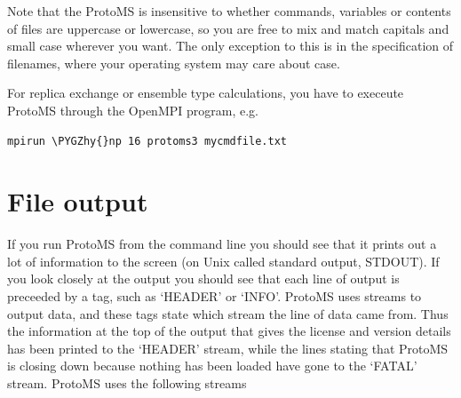 \documentclass[letterpaper,10pt,english]{sphinxmanual}
\def\PYGZhy{\char`\-}
\begin{document}
Note that the ProtoMS is insensitive to whether commands, variables or contents of files are uppercase or lowercase, so you are free to mix and match capitals and small case wherever you want. The only exception to this is in the specification of filenames, where your operating system may care about case.

For replica exchange or ensemble type calculations, you have to execeute ProtoMS through the OpenMPI program, e.g.

\begin{Verbatim}[frame=single,commandchars=\\\{\}]
mpirun \PYGZhy{}np 16 protoms3 mycmdfile.txt
\end{Verbatim}


\section{File output}
\label{protoms:file-output}\label{protoms:index-27}
If you run ProtoMS from the command line you should see that it prints out a lot of information to the screen (on Unix called standard output, STDOUT). If you look closely at the output you should see that each line of output is preceeded by a tag, such as ‘HEADER’ or ‘INFO’. ProtoMS uses streams to output data, and these tags state which stream the line of data came from. Thus the information at the top of the output that gives the license and version details has been printed to the ‘HEADER’ stream, while the lines stating that ProtoMS is closing down because nothing has been loaded have gone to the ‘FATAL’ stream. ProtoMS uses the following streams
\end{document}
